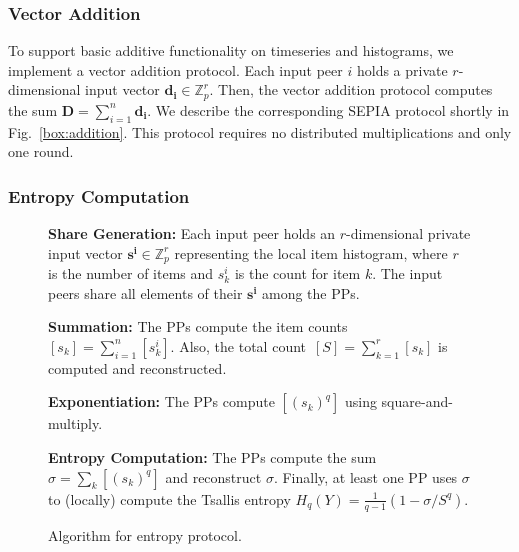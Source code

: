 \documentclass[letterpaper,11pt,onecolumn,titlepage]{article}
\begin{document}
\subsubsection{Vector Addition}
\label{sec:addition}

To support basic additive functionality on timeseries and histograms, we implement a vector addition protocol.
Each input peer $i$ holds a private $r$-dimensional input vector $\mathbf{d_i} \in \mathbb{Z}_p^r$. 
Then, the vector addition protocol computes the sum \(\mathbf{D} = \sum_{i=1}^{n}\mathbf{d_i} \). We describe the 
corresponding SEPIA protocol shortly in Fig.~\ref{box:addition}. 
This protocol requires no distributed multiplications and only one round.

\subsubsection{Entropy Computation}
\label{sec:entropy}

\begin{figure}[t]
	\begin{boxedminipage}{1\textwidth}
	\begin{small}
	\begin{compactenum}
	
	\item \textbf{Share Generation:} Each input peer holds an $r$-dimensional private input vector
		$\mathbf{s^i} \in \mathbb{Z}_p^r$ representing the local item histogram, where $r$ is the number of items and $s_k^i$ is the count
		for item $k$. The input peers share all elements of their $\mathbf{\mathbf{s^i}}$ among the PPs.
	
	\item \textbf{Summation:} The PPs compute the item counts $[s_k] = \sum_{i=1}^{n}{[s_k^i]}$. Also, the total count~$[S]=\sum_{k=1}^r{[s_k]}$ is computed and reconstructed. 
	
	\item \textbf{Exponentiation:} The PPs compute $[(s_k)^q]$ using square-and-multiply.


	\item \textbf{Entropy Computation:} The PPs compute the sum $\sigma=\sum_{k}{[(s_k)^q]}$ and reconstruct $\sigma$.
	Finally, at least one PP uses $\sigma$ to (locally) compute the
	Tsallis entropy $H_q(Y) = \frac{1}{q-1} (1- {\sigma}/{S^q})$.
	
	\end{compactenum}
	\end{small}
	\end{boxedminipage}
	\caption{Algorithm for entropy protocol.}
	\label{box:entropy}
\end{figure}
\end{document}
